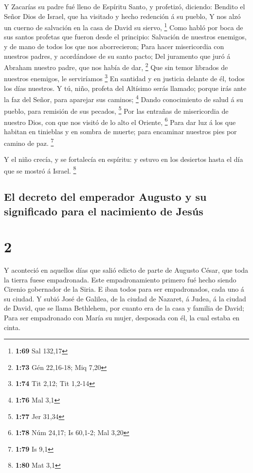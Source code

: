  Y Zacarías su padre fué lleno de Espíritu Santo, y
profetizó, diciendo:  Bendito el Señor Dios de Israel,
que ha visitado y hecho redención á su pueblo,  Y nos
alzó un cuerno de salvación en la casa de David su siervo, \footnote{\textbf{1:69}
  Sal 132,17}  Como habló por boca de sus santos profetas
que fueron desde el principio:  Salvación de nuestros
enemigos, y de mano de todos los que nos aborrecieron; 
Para hacer misericordia con nuestros padres, y acordándose de su santo
pacto;  Del juramento que juró á Abraham nuestro padre,
que nos había de dar, \footnote{\textbf{1:73} Gén 22,16-18; Miq 7,20}
 Que sin temor librados de nuestros enemigos, le
serviríamos \footnote{\textbf{1:74} Tit 2,12; Tit 1,2-14}
 En santidad y en justicia delante de él, todos los días
nuestros.  Y tú, niño, profeta del Altísimo serás
llamado; porque irás ante la faz del Señor, para aparejar sus caminos;
\footnote{\textbf{1:76} Mal 3,1}  Dando conocimiento de
salud á su pueblo, para remisión de sus pecados, \footnote{\textbf{1:77}
  Jer 31,34}  Por las entrañas de misericordia de nuestro
Dios, con que nos visitó de lo alto el Oriente, \footnote{\textbf{1:78}
  Núm 24,17; Is 60,1-2; Mal 3,20}  Para dar luz á los que
habitan en tinieblas y en sombra de muerte; para encaminar nuestros pies
por camino de paz. \footnote{\textbf{1:79} Is 9,1}

 Y el niño crecía, y se fortalecía en espíritu: y estuvo
en los desiertos hasta el día que se mostró á Israel. \footnote{\textbf{1:80}
  Mat 3,1}

\hypertarget{el-decreto-del-emperador-augusto-y-su-significado-para-el-nacimiento-de-jesuxfas}{%
\subsection{El decreto del emperador Augusto y su significado para el
nacimiento de
Jesús}\label{el-decreto-del-emperador-augusto-y-su-significado-para-el-nacimiento-de-jesuxfas}}

\hypertarget{section-1}{%
\section{2}\label{section-1}}

 Y aconteció en aquellos días que salió edicto de parte de
Augusto César, que toda la tierra fuese empadronada.  Este
empadronamiento primero fué hecho siendo Cirenio gobernador de la Siria.
 E iban todos para ser empadronados, cada uno á su ciudad.
 Y subió José de Galilea, de la ciudad de Nazaret, á
Judea, á la ciudad de David, que se llama Bethlehem, por cuanto era de
la casa y familia de David;  Para ser empadronado con
María su mujer, desposada con él, la cual estaba en cinta.

